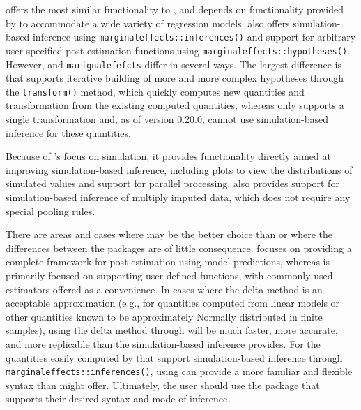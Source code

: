  offers the most similar functionality to , and  depends on functionality provided by  to accommodate a wide variety of regression models.  also offers simulation-based inference using \texttt{marginaleffects::inferences()} and support for arbitrary user-specified post-estimation functions using \texttt{marginaleffects::hypotheses()}. However,  and \texttt{marignalefefcts} differ in several ways. The largest difference is that  supports iterative building of more and more complex hypotheses through the \texttt{transform()} method, which quickly computes new quantities and transformation from the existing computed quantities, whereas  only supports a single transformation and, as of version 0.20.0, cannot use simulation-based inference for these quantities.

Because of 's focus on simulation, it provides functionality directly aimed at improving simulation-based inference, including plots to view the distributions of simulated values and support for parallel processing.  also provides support for simulation-based inference of multiply imputed data, which does not require any special pooling rules.

There are areas and cases where  may be the better choice than  or where the differences between the packages are of little consequence.  focuses on providing a complete framework for post-estimation using model predictions, whereas  is primarily focused on supporting user-defined functions, with commonly used estimators offered as a convenience. In cases where the delta method is an acceptable approximation (e.g., for quantities computed from linear models or other quantities known to be approximately Normally distributed in finite samples), using the delta method through  will be much faster, more accurate, and more replicable than the simulation-based inference  provides. For the quantities easily computed by  that support simulation-based inference through \texttt{marginaleffects::inferences()}, using  can provide a more familiar and flexible syntax than  might offer. Ultimately, the user should use the package that supports their desired syntax and mode of inference.

